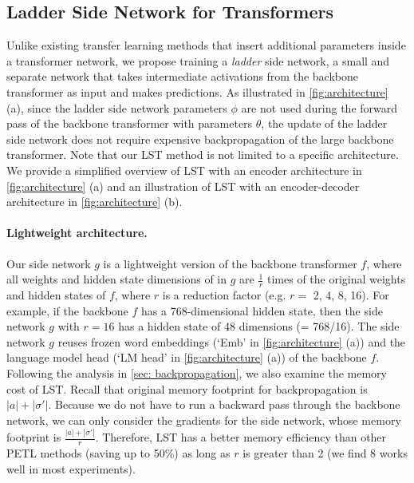 \subsection{Ladder Side Network for Transformers}
\label{sec: side transformer}

Unlike existing transfer learning methods that insert additional parameters inside a transformer network, we propose training a \textit{ladder} side network, a small and separate network that takes intermediate activations from the backbone transformer as input and makes predictions. As illustrated in \ref{fig:architecture} (a), since the ladder side network parameters $\phi$ are not used during the forward pass of the backbone transformer with parameters $\theta$, the update of the ladder side network does not require expensive backpropagation of the large backbone transformer. Note that our LST method is not limited to a specific architecture. We provide a simplified overview of LST with an encoder architecture in \ref{fig:architecture} (a) and an illustration of LST with an encoder-decoder architecture in \ref{fig:architecture} (b).

\paragraph{Lightweight architecture.} Our side network $g$ is a lightweight version of the backbone transformer $f$, where all weights and hidden state dimensions of in $g$ are $\frac{1}{r}$ times of the original weights and hidden states of $f$, where $r$ is a reduction factor (e.g. $r=$ 2, 4, 8, 16). For example, if the backbone $f$ has a 768-dimensional hidden state, then the side network $g$ with $r=16$ has a hidden state of 48 dimensions (= 768/16). The side network $g$ reuses frozen word embeddings (`Emb' in \ref{fig:architecture} (a)) and the language model head (`LM head' in \ref{fig:architecture} (a)) of the backbone $f$. Following the analysis in \ref{sec: backpropagation}, we also examine the memory cost of LST. Recall that original memory footprint for backpropagation is $|a| + |\sigma'|$.
Because we do not have to run a backward pass through the backbone network, we can only consider the gradients for the side network, whose memory footprint is $\frac{|a| + |\sigma'|}{r}$.
Therefore, LST has a better memory efficiency than other PETL methods (saving up to 50\%) as long as $r$ is greater than 2 (we find 8 works well in most experiments).

